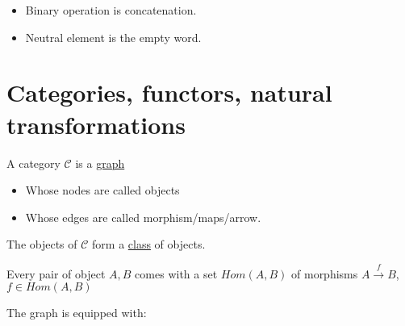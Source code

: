 \documentclass{article}
\theoremstyle{plain}
\begin{document}
  \begin{itemize}
    \item Binary operation is concatenation.
    \item Neutral element is the empty word.
  \end{itemize}

  \section{Categories, functors, natural transformations}

   A category $\mathcal C$ is a \underline{graph}
    \begin{itemize}
      \item Whose nodes are called objects
      \item Whose edges are called morphism/maps/arrow.
    \end{itemize}

    The objects of $\mathcal C$ form a \underline{class} of objects.

    Every pair of object $A,B$ comes with a set $Hom(A, B)$ of morphisms
    $A \xrightarrow{f} B$, $f \in Hom(A, B)$

    The graph is equipped with:
\end{document}

